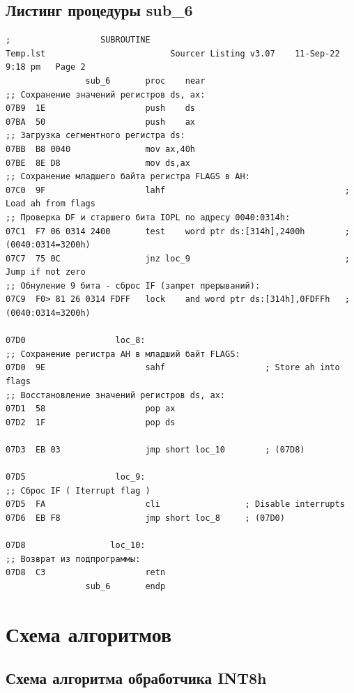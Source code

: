 \documentclass[a4paper,14pt]{article}
\begin{document}
\subsection{Листинг процедуры sub\_6}
\begin{lstlisting}[style={asm}]
;			       SUBROUTINE
Temp.lst						 Sourcer Listing v3.07    11-Sep-22   9:18 pm   Page 2
				sub_6		proc	near
;; Сохранение значений регистров ds, ax:
07B9  1E					push	ds
07BA  50					push	ax
;; Загрузка сегментного регистра ds:
07BB  B8 0040				mov	ax,40h
07BE  8E D8					mov	ds,ax
;; Сохранение младшего байта регистра FLAGS в AH:
07C0  9F					lahf									; Load ah from flags
;; Проверка DF и старшего бита IOPL по адресу 0040:0314h:
07C1  F7 06 0314 2400		test	word ptr ds:[314h],2400h		; (0040:0314=3200h)
07C7  75 0C					jnz	loc_9								; Jump if not zero
;; Обнуление 9 бита - сброс IF (запрет прерываний):
07C9  F0> 81 26 0314 FDFF	lock	and	word ptr ds:[314h],0FDFFh	; (0040:0314=3200h)

07D0			      loc_8:
;; Сохранение регистра AH в младший байт FLAGS:
07D0  9E					sahf					; Store ah into flags
;; Восстановление значений регистров ds, ax:
07D1  58					pop	ax
07D2  1F					pop	ds

07D3  EB 03					jmp	short loc_10		; (07D8)

07D5			      loc_9:
;; Сброс IF ( Iterrupt flag )
07D5  FA					cli					; Disable interrupts
07D6  EB F8					jmp	short loc_8		; (07D0)

07D8			     loc_10:
;; Возврат из подпрограммы:
07D8  C3					retn
				sub_6		endp	
\end{lstlisting}
\clearpage
\section{Схема алгоритмов}
\subsection{Схема алгоритма обработчика INT8h}
\end{document}
